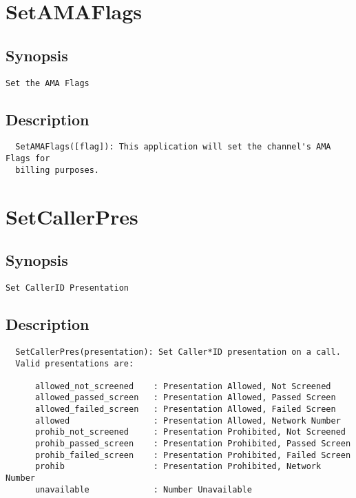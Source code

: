 \section{SetAMAFlags}
\subsection{Synopsis}
\begin{verbatim}
Set the AMA Flags
\end{verbatim}
\subsection{Description}
\begin{verbatim}
  SetAMAFlags([flag]): This application will set the channel's AMA Flags for
  billing purposes.

\end{verbatim}


\section{SetCallerPres}
\subsection{Synopsis}
\begin{verbatim}
Set CallerID Presentation
\end{verbatim}
\subsection{Description}
\begin{verbatim}
  SetCallerPres(presentation): Set Caller*ID presentation on a call.
  Valid presentations are:

      allowed_not_screened    : Presentation Allowed, Not Screened
      allowed_passed_screen   : Presentation Allowed, Passed Screen
      allowed_failed_screen   : Presentation Allowed, Failed Screen
      allowed                 : Presentation Allowed, Network Number
      prohib_not_screened     : Presentation Prohibited, Not Screened
      prohib_passed_screen    : Presentation Prohibited, Passed Screen
      prohib_failed_screen    : Presentation Prohibited, Failed Screen
      prohib                  : Presentation Prohibited, Network Number
      unavailable             : Number Unavailable


\end{verbatim}


